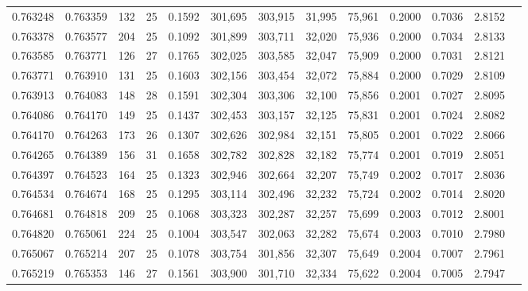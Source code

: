 \begin{tabular}{rrrrrrrrrrrrr}
0.763248 & 0.763359 &   132 &  25 &                                     0.1592 & 301,695 & 303,915 &  31,995 &  75,961 & 0.2000 & 0.7036 & 2.8152 \\
0.763378 & 0.763577 &   204 &  25 &                                     0.1092 & 301,899 & 303,711 &  32,020 &  75,936 & 0.2000 & 0.7034 & 2.8133 \\
0.763585 & 0.763771 &   126 &  27 &                                     0.1765 & 302,025 & 303,585 &  32,047 &  75,909 & 0.2000 & 0.7031 & 2.8121 \\
0.763771 & 0.763910 &   131 &  25 &                                     0.1603 & 302,156 & 303,454 &  32,072 &  75,884 & 0.2000 & 0.7029 & 2.8109 \\
0.763913 & 0.764083 &   148 &  28 &                                     0.1591 & 302,304 & 303,306 &  32,100 &  75,856 & 0.2001 & 0.7027 & 2.8095 \\
0.764086 & 0.764170 &   149 &  25 &                                     0.1437 & 302,453 & 303,157 &  32,125 &  75,831 & 0.2001 & 0.7024 & 2.8082 \\
0.764170 & 0.764263 &   173 &  26 &                                     0.1307 & 302,626 & 302,984 &  32,151 &  75,805 & 0.2001 & 0.7022 & 2.8066 \\
0.764265 & 0.764389 &   156 &  31 &                                     0.1658 & 302,782 & 302,828 &  32,182 &  75,774 & 0.2001 & 0.7019 & 2.8051 \\
0.764397 & 0.764523 &   164 &  25 &                                     0.1323 & 302,946 & 302,664 &  32,207 &  75,749 & 0.2002 & 0.7017 & 2.8036 \\
0.764534 & 0.764674 &   168 &  25 &                                     0.1295 & 303,114 & 302,496 &  32,232 &  75,724 & 0.2002 & 0.7014 & 2.8020 \\
0.764681 & 0.764818 &   209 &  25 &                                     0.1068 & 303,323 & 302,287 &  32,257 &  75,699 & 0.2003 & 0.7012 & 2.8001 \\
0.764820 & 0.765061 &   224 &  25 &                                     0.1004 & 303,547 & 302,063 &  32,282 &  75,674 & 0.2003 & 0.7010 & 2.7980 \\
0.765067 & 0.765214 &   207 &  25 &                                     0.1078 & 303,754 & 301,856 &  32,307 &  75,649 & 0.2004 & 0.7007 & 2.7961 \\
0.765219 & 0.765353 &   146 &  27 &                                     0.1561 & 303,900 & 301,710 &  32,334 &  75,622 & 0.2004 & 0.7005 & 2.7947 \\

\end{tabular}
